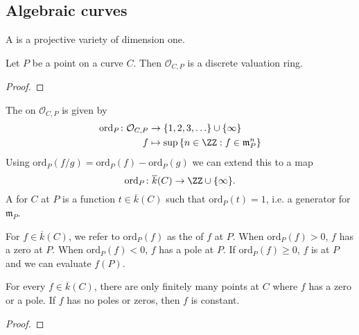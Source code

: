 \subsection{Algebraic curves}

\begin{definition}
    A  is a projective variety of dimension one.
\end{definition}

\begin{proposition}
    Let $P$ be a point on a curve $C$. Then $\mathcal{O}_{C, P}$ is a discrete valuation ring.
\end{proposition}
\begin{proof}
\end{proof}

\begin{definition}
    The  on $\mathcal{O}_{C, P}$ is given by
    \begin{align*}
        \text{ord}_P \colon \mathcal{O}_{C, P} &\to \{ 1, 2, 3, \ldots \} \cup \{ \infty \} \\
        f &\mapsto \sup \left\{ n \in \ZZ : f \in \mathfrak{m}_P^n \right\}
    \end{align*}
    Using $\text{ord}_P(f / g) = \text{ord}_P(f) - \text{ord}_P(g)$  we can extend this to a map
    \[ \text{ord}_P \colon \overline{k}(C) \to \ZZ \cup \{ \infty \} . \]
    A  for $C$ at $P$ is a function $t \in \overline{k}(C)$ such that $\text{ord}_P(t) = 1$, i.e. a generator for $\mathfrak{m}_P$.
    
    For $f \in \overline{k}(C)$, we refer to $\text{ord}_P(f)$ as the  of $f$ at $P$. When $\text{ord}_P(f) > 0$, $f$ has a zero at $P$. When $\text{ord}_P(f) < 0$, $f$ has a pole at $P$. If $\text{ord}_P(f) \ge 0$, $f$ is  at $P$ and we can evaluate $f(P)$.
\end{definition}


\begin{proposition}
    For every $f \in \overline{k}(C)$, there are only finitely many points at $C$ where $f$ has a zero or a pole. If $f$ has no poles or zeros, then $f$ is constant.
\end{proposition}

\begin{proof}
\end{proof}

